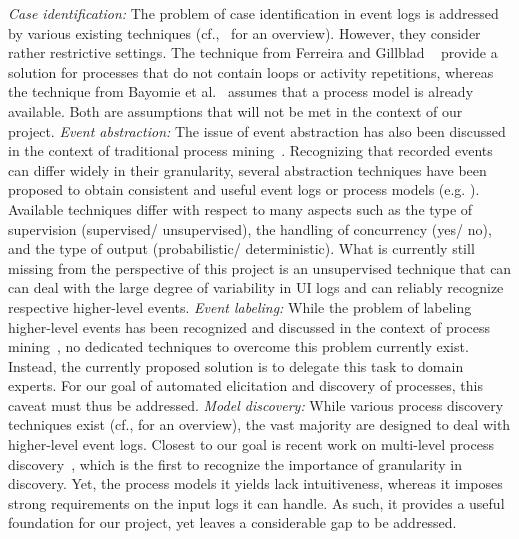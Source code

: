 \vspace{0.2em}
\newline%
\noindent \textit{Case identification:}  The problem of case identification in event logs is addressed by various existing techniques (cf.,~\cite{diba2020extraction} for an overview). However, they consider rather restrictive settings. The technique from Ferreira and Gillblad ~\cite{ferreira2009discovering} provide a solution for processes that do not contain loops or activity repetitions, whereas the technique from Bayomie et al.~\cite{bayomie2019probabilistic} assumes that a process model is already available. Both are assumptions that will not be met in the context of our project. 
\vspace{0.2em}
\newline%
\noindent \textit{Event abstraction:} 
The issue of event abstraction has also been discussed in the context of traditional process mining~\cite{van2020event,diba2020extraction}. Recognizing that recorded events can differ widely in their granularity, several abstraction techniques have been proposed to obtain consistent and useful event logs or process models (e.g. \cite{baier2014bridging,van2020event,de2020event}). Available techniques differ with respect to many aspects such as the type of supervision (supervised/ unsupervised), the handling of concurrency (yes/ no), and the type of output (probabilistic/ deterministic). What is currently still missing from the perspective of this project is an unsupervised technique that can can deal with the large degree of variability in UI logs and can reliably recognize respective higher-level events. 
\vspace{0.2em}
\newline%
\noindent \textit{Event labeling:} 
While the problem of labeling higher-level events has been recognized and discussed in the context of process mining~\cite{van2020event,van2016enabling}, no dedicated techniques to overcome this problem currently exist. Instead, the  currently proposed solution is to delegate this task to domain experts. For our goal of automated elicitation and discovery of processes, this caveat must thus be addressed.   
\vspace{0.2em}
\newline%
\noindent \textit{Model discovery:} 
While various process discovery techniques exist (cf., \cite{augusto2018automated} for an overview), the vast majority are designed to deal with higher-level event logs. Closest to our goal is recent work on multi-level process discovery~\cite{leemans2020using}, which is the first to recognize the importance of granularity in discovery. Yet, the process models it yields lack intuitiveness, whereas it imposes strong requirements on the input logs it can handle. As such, it provides a useful foundation for our project, yet leaves a considerable gap to be addressed.

